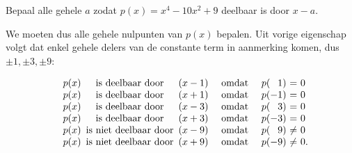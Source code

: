 \documentclass{ximera}
\begin{document}
\begin{example} 
	Bepaal alle gehele \(a\) zodat  \(p(x) = x^4-10x^2+9\) deelbaar is door \(x-a\).
	 
	We moeten dus alle gehele nulpunten van \(p(x)\) bepalen. Uit vorige eigenschap volgt dat enkel gehele delers van de constante term in aanmerking komen, dus \(\pm1,\pm3,\pm9\):
	 
	\renewcommand{\bullet}{}   %
	\[
	\begin{array}{lr@{\,}c@{\,}lcl@{}c@{}r@{}c@{\ }c@{\ }l}
	\bullet&p(x)&\textrm{ is deelbaar door }   &(x-1)&\textrm{ omdat }&p&(& 1&)&=   &0\\
	\bullet&p(x)&\textrm{ is deelbaar door }   &(x+1)&\textrm{ omdat }&p&(&-1&)&=   &0\\
	\bullet&p(x)&\textrm{ is deelbaar door }    &(x-3)&\textrm{ omdat }&p&(& 3&)&=   &0\\
	\bullet&p(x)&\textrm{ is deelbaar door }   &(x+3)&\textrm{ omdat }&p&(&-3&)&=   &0\\
	\bullet&p(x)&\textrm{ is niet deelbaar door }&(x-9)&\textrm{ omdat }&p&(& 9&)&\neq&0\\
	\bullet&p(x)&\textrm{ is niet deelbaar door }&(x+9)&\textrm{ omdat }&p&(&-9&)&\neq&0.
	\end{array}
	\]
	 
\end{example}
	 
\end{document}
